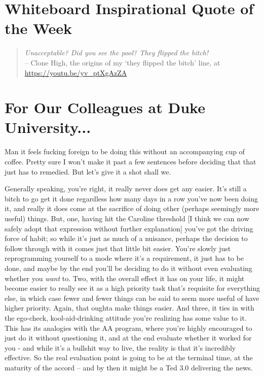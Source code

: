 \documentclass[12pt]{article}
\begin{document}
\newpage
{}
\section*{Whiteboard Inspirational Quote of the Week}
\begin{quote}
\textit{Unacceptable? Did you see the pool? They flipped the bitch!} \\ -- Clone High, the origins of my `they flipped the bitch' line, at \url{https://youtu.be/yv_ptXgAzZA}
\end{quote}
\section*{For Our Colleagues at Duke University...}
Man it feels fucking foreign to be doing this without an accompanying cup of coffee. Pretty sure I won't make it past a few sentences before deciding that that just has to remedied. But let's give it a shot shall we. \par 
Generally speaking, you're right, it really never does get any easier. It's still a bitch to go get it done regardless how many days in a row you've now been doing it, and really it does come at the sacrifice of doing other (perhaps seemingly more useful) things. But, one, having hit the Caroline threshold [I think we can now safely adopt that expression without further explanation] you've got the driving force of habit; so while it's just as much of a nuisance, perhaps the decision to follow through with it comes just that little bit easier. You're slowly just reprogramming yourself to a mode where it's a requirement, it just has to be done, and maybe by the end you'll be deciding to do it without even evaluating whether you \emph{want} to. Two, with the overall effect it has on your life, it might become easier to really see it as a high priority task that's requisite for everything else, in which case fewer and fewer things can be said to seem more useful of have higher priority. Again, that oughta make things easier. And three, it ties in with the ego-check, kool-aid-drinking attitude you're realizing has some value to it. This has its analogies with the AA program, where you're highly encouraged to just do it without questioning it, and at the end evaluate whether it worked for you - and while it's a bullshit way to live, the reality is that it's incredibly effective. So the real evaluation point is going to be at the terminal time, at the maturity of the accord -- and by then it might be a Ted 3.0 delivering the news. \par 
\end{document}
